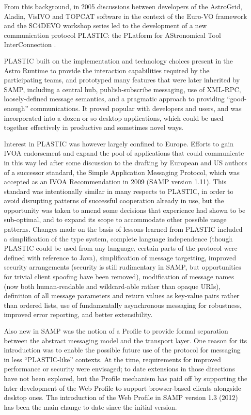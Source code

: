 \documentclass[5p]{elsarticle}
\begin{document}
From this background, in 2005 discussions between developers of
the AstroGrid, Aladin, VisIVO and TOPCAT software
in the context of the Euro-VO
framework and the SC4DEVO workshop series led to the development
of a new communication protocol PLASTIC:
the PLatform for AStronomical Tool InterConnection
\citep{2007ASPC..376..511T,plastic_note}.

PLASTIC built on the implementation and technology choices
present in the Astro Runtime to provide the interaction
capabilities required by the participating teams,
and prototyped many features that were later inherited by SAMP,
including a central hub, publish-subscribe messaging, use of XML-RPC,
loosely-defined message semantics, and a pragmatic approach
to providing ``good-enough'' communications.
It proved popular with developers and users, %
and was incorporated into a dozen or so desktop applications,
which could be used together effectively
in productive and sometimes novel ways.

Interest in PLASTIC was however largely confined to Europe.
Efforts to gain IVOA endorsement and expand the pool
of applications that could communicate in this way
led after some discussion to the drafting by European and US authors
of a successor standard, the Simple Application Messaging Protocol,
which was accepted as an IVOA Recommendation in 2009 (SAMP version 1.11).
This standard was intentionally similar in many respects to PLASTIC,
in order to avoid disrupting patterns of successful
cooperation already in use,
but the opportunity was taken to amend some decisions that experience had
shown to be sub-optimal, and to expand its scope to accommodate
other possible usage patterns.
Changes made on the basis of lessons learned from PLASTIC included
a simplification of the type system,
complete language independence
(though PLASTIC could be used from any language,
certain parts of the protocol were defined with reference to Java),
simplification of message targetting,
improved security arrangements
(security is still rudimentary in SAMP, but opportunities for
trivial client spoofing have been removed),
modification of message names
(now both human-readable and wildcard-able rather than opaque URIs),
definition of all message parameters and return values as
key-value pairs rather than ordered lists,
use of fundamentally asynchronous messaging for robustness,
improved error reporting,
and better extensibility.

Also new in SAMP was the notion of a Profile to provide formal separation
between the abstract messaging model and the transport layer.
One reason for its introduction was to enable the possible future
use of the protocol for messaging in less ``PLASTIC-like'' contexts.
At the time, requirements for improved performance or security were
envisaged; to date extensions in those directions have not been
explored, but the Profile mechanism has paid off by supporting
the later development of the Web Profile to support browser-based
clients alongside desktop ones.
The introduction of the Web Profile in SAMP version 1.3 (2012)
has been the main change to date since the initial version.
\end{document}
